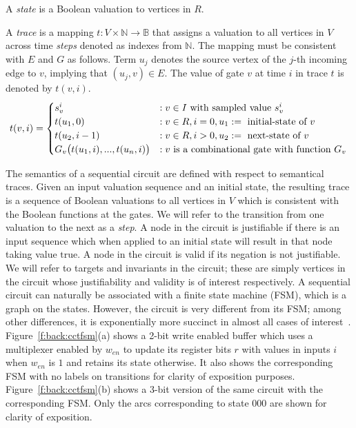 \begin{definition}[State]
\rm A {\em state} is a Boolean valuation to vertices in $R$. 
\end{definition}

\begin{definition}[Trace]
\rm A {\em trace} is a mapping $t: V \times \mathbb{N} \rightarrow
\mathbb{B}$ that assigns a valuation to all vertices in
$V$ across time {\em steps} denoted as indexes from
$\mathbb{N}$.  The mapping must be consistent with $E$ and
$G$ as follows.  Term $u_{j}$ denotes the source vertex of
the $j$-th incoming edge to $v$, implying that
$(u_{j},v)\in E$.  The value of gate $v$ at time $i$ in
trace $t$ is denoted by $t(v,i)$.
\[
t(v,i)=
   \begin{cases}
      s^i_{v}            &:v \in I \ \text{with sampled value $s_{v}^i$}\\
      t(u_1, 0)       &:v \in R,i=0,u_1:=\ \text{initial-state of $v$}\\
      t(u_2, i-1)        &:v \in R,i>0,u_2:=\ \text{next-state of $v$}\\
      G_v\big(t(u_{1},i),...,t(u_{n},i)\big) &: v \ \text{is a combinational gate with function 
$G_v$}
   \end{cases} \\
\]
\end{definition}

The semantics of a sequential circuit are defined with
respect to semantical traces.  Given an input valuation
sequence and an initial state, the resulting trace is a
sequence of Boolean valuations to all vertices in $V$
which is consistent with the Boolean functions at the
gates.  We will refer to the transition from one valuation
to the next as a {\em step}.  A node in the circuit is
justifiable if there is an input sequence which when
applied to an initial state will result in that node
taking value $\mbox{true}$.  A node in the circuit is
valid if its negation is not justifiable.  We will refer
to targets and invariants in the circuit; these are simply
vertices in the circuit whose justifiability and validity
is of interest respectively.
A sequential circuit can naturally
be associated with a finite state machine (FSM),
which is a graph on the states.  However, the 
circuit is very different from its FSM; among
other differences, it is exponentially more succinct in
almost all cases of interest~\cite{BuClMcDiHw92}. 
Figure~\ref{f:back:cctfsm}(a) shows a 2-bit write enabled 
buffer which uses a multiplexer enabled by $w_{en}$ to 
update its register bits $r$ with values in inputs $i$ 
when $w_{en}$ is $1$ and retains its state otherwise.
It also shows the corresponding FSM with no labels on
transitions for clarity of exposition purposes.
Figure~\ref{f:back:cctfsm}(b) shows a 3-bit version of 
the same circuit with the corresponding FSM. 
Only the arcs corresponding to state $000$ are shown for 
clarity of exposition.



